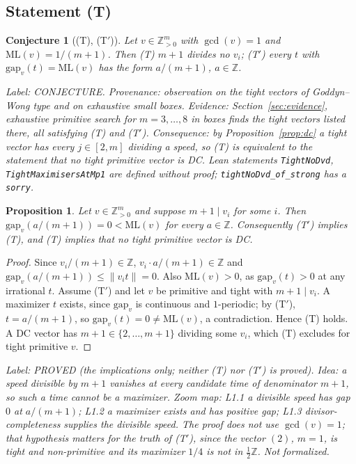 \documentclass[11pt]{article}
\newtheorem{proposition}[theorem]{Proposition}
\newtheorem{conjecture}[theorem]{Conjecture}
\theoremstyle{remark}
\newcommand{\norm}[1]{\lVert #1\rVert}
\newcommand{\ML}{\mathrm{ML}}
\newcommand{\gap}{\mathrm{gap}}
\newcommand{\Z}{\mathbb{Z}}
\newcommand{\lab}[1]{\par\smallskip\noindent\textit{Label: #1.}}
\begin{document}
\subsection{Statement (T)}
\begin{conjecture}[(T), (T$'$)]\label{conj:T}
Let $v\in\Z_{>0}^m$ with $\gcd(v)=1$ and $\ML(v)=1/(m+1)$. Then
(T) $m+1$ divides no $v_i$;
(T$'$) every $t$ with $\gap_v(t)=\ML(v)$ has the form $a/(m+1)$, $a\in\Z$.
\end{conjecture}
\lab{CONJECTURE. Provenance: observation on the tight vectors of Goddyn--Wong type and on exhaustive small boxes. Evidence: Section~\ref{sec:evidence}, exhaustive primitive search for $m=3,\dots,8$ in boxes finds the tight vectors listed there, all satisfying (T) and (T$'$). Consequence: by Proposition~\ref{prop:dc} a tight vector has every $j\in[2,m]$ dividing a speed, so (T) is equivalent to the statement that no tight primitive vector is DC. Lean statements \texttt{TightNoDvd}, \texttt{TightMaximisersAtMp1} are defined without proof; \texttt{tightNoDvd\_of\_strong} has a \texttt{sorry}}

\begin{proposition}\label{prop:T}
Let $v\in\Z_{>0}^m$ and suppose $m+1\mid v_i$ for some $i$. Then $\gap_v(a/(m+1))=0<\ML(v)$ for every $a\in\Z$. Consequently (T$'$) implies (T), and (T) implies that no tight primitive vector is DC.
\end{proposition}
\begin{proof}
Since $v_i/(m+1)\in\Z$, $v_i\cdot a/(m+1)\in\Z$ and $\gap_v(a/(m+1))\le\norm{v_it}=0$. Also $\ML(v)>0$, as $\gap_v(t)>0$ at any irrational $t$. Assume (T$'$) and let $v$ be primitive and tight with $m+1\mid v_i$. A maximizer $t$ exists, since $\gap_v$ is continuous and $1$-periodic; by (T$'$), $t=a/(m+1)$, so $\gap_v(t)=0\ne\ML(v)$, a contradiction. Hence (T) holds. A DC vector has $m+1\in\{2,\dots,m+1\}$ dividing some $v_i$, which (T) excludes for tight primitive $v$.
\end{proof}
\lab{PROVED (the implications only; neither (T) nor (T$'$) is proved). Idea: a speed divisible by $m+1$ vanishes at every candidate time of denominator $m+1$, so such a time cannot be a maximizer. Zoom map: L1.1 a divisible speed has gap $0$ at $a/(m+1)$; L1.2 a maximizer exists and has positive gap; L1.3 divisor-completeness supplies the divisible speed. The proof does not use $\gcd(v)=1$; that hypothesis matters for the truth of (T$'$), since the vector $(2)$, $m=1$, is tight and non-primitive and its maximizer $1/4$ is not in $\frac12\Z$. Not formalized}
\end{document}
